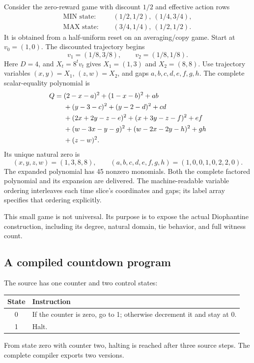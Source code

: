 \documentclass[11pt,letterpaper]{article}
\theoremstyle{definition}
\theoremstyle{remark}
\begin{document}
Consider the zero-reward game with discount $1/2$ and effective action rows
\begin{align*}
 \text{MIN state: }&\quad(1/2,1/2),\ (1/4,3/4),\\
 \text{MAX state: }&\quad(3/4,1/4),\ (1/2,1/2).
\end{align*}
It is obtained from a half-uniform reset on an averaging/copy game. Start
at $v_0=(1,0)$. The discounted trajectory begins
\[
 v_1=(1/8,3/8),\qquad v_2=(1/8,1/8).
\]
Here $D=4$, and $X_t=8^tv_t$ gives $X_1=(1,3)$ and $X_2=(8,8)$.
Use trajectory variables $(x,y) = X_1$, $(z,w)=X_2$, and gaps
$a,b,c,d,e,f,g,h$. The complete scalar-equality polynomial is
\begin{align}
 Q={}&(2-x-a)^2+(1-x-b)^2+ab\notag\\
 &+(y-3-c)^2+(y-2-d)^2+cd\notag\\
 &+(2x+2y-z-e)^2+(x+3y-z-f)^2+ef\notag\\
 &+(w-3x-y-g)^2+(w-2x-2y-h)^2+gh\notag\\
 &+(z-w)^2.
 \label{ste:ec:eq:small-complete}
\end{align}
Its unique natural zero is
\[
 (x,y,z,w)=(1,3,8,8),\qquad
 (a,b,c,d,e,f,g,h)=(1,0,0,1,0,2,2,0).
\]
The expanded polynomial has 45 nonzero monomials. Both the complete factored
polynomial and its expansion are delivered. The machine-readable variable
ordering interleaves each time slice's coordinates and gaps; its label
array specifies that ordering explicitly.

This small game is not universal. Its purpose is to expose the actual
Diophantine construction, including its degree, natural domain, tie
behavior, and full witness count.

\subsection{A compiled countdown program}

The source has one counter and two control states:
\begin{center}
\begin{tabular}{cl}
\toprule
State & Instruction\\\midrule
0 & If the counter is zero, go to 1; otherwise decrement it and stay at 0.\\
1 & Halt.\\\bottomrule
\end{tabular}
\end{center}
From state zero with counter two, halting is reached after three source
steps. The complete compiler exports two versions.
\end{document}
